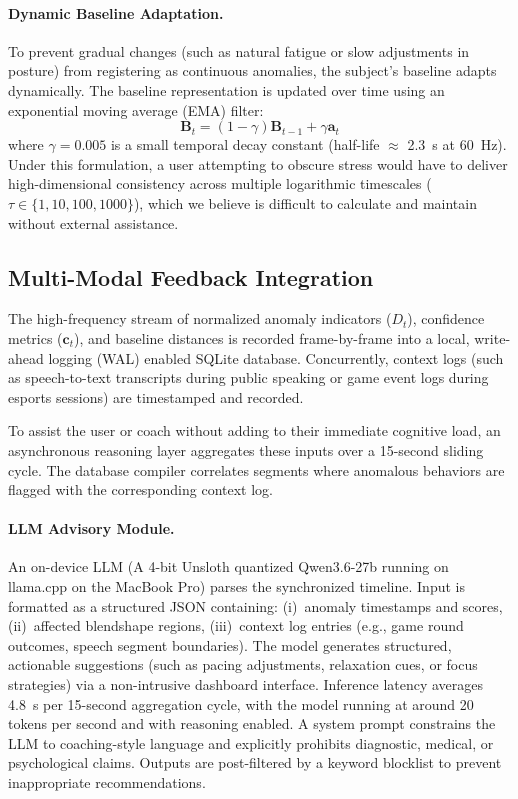 \documentclass[sigconf]{acmart}
\begin{document}
\paragraph{Dynamic Baseline Adaptation.}
To prevent gradual changes (such as natural fatigue or slow adjustments in posture) from registering as continuous anomalies, the subject's baseline adapts dynamically. The baseline representation is updated over time using an exponential moving average (EMA) filter:
$$\mathbf{B}_t = (1 - \gamma)\mathbf{B}_{t-1} + \gamma \mathbf{a}_t$$
where $\gamma = 0.005$ is a small temporal decay constant (half-life $\approx$ 2.3~s at 60~Hz). Under this formulation, a user attempting to obscure stress would have to deliver high-dimensional consistency across multiple logarithmic timescales ($\tau \in \{1, 10, 100, 1000\}$), which we believe is difficult to calculate and maintain without external assistance.

\subsection{Multi-Modal Feedback Integration}
The high-frequency stream of normalized anomaly indicators ($D_t$), confidence metrics ($\mathbf{c}_t$), and baseline distances is recorded frame-by-frame into a local, write-ahead logging (WAL) enabled SQLite database. Concurrently, context logs (such as speech-to-text transcripts during public speaking or game event logs during esports sessions) are timestamped and recorded.

To assist the user or coach without adding to their immediate cognitive load, an asynchronous reasoning layer aggregates these inputs over a 15-second sliding cycle. The database compiler correlates segments where anomalous behaviors are flagged with the corresponding context log. 

\paragraph{LLM Advisory Module.}
An on-device LLM (A 4-bit Unsloth quantized Qwen3.6-27b running on llama.cpp on the MacBook Pro) parses the synchronized timeline. Input is formatted as a structured JSON containing: (i)~anomaly timestamps and scores, (ii)~affected blendshape regions, (iii)~context log entries (e.g., game round outcomes, speech segment boundaries). The model generates structured, actionable suggestions (such as pacing adjustments, relaxation cues, or focus strategies) via a non-intrusive dashboard interface. Inference latency averages 4.8~s per 15-second aggregation cycle, with the model running at around 20 tokens per second and with reasoning enabled. A system prompt constrains the LLM to coaching-style language and explicitly prohibits diagnostic, medical, or psychological claims. Outputs are post-filtered by a keyword blocklist to prevent inappropriate recommendations.
\end{document}
